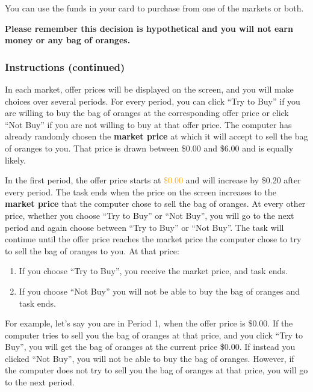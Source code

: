 \documentclass[12pt]{article}
\begin{document}
You can use the funds in your card to purchase from one of the markets or both.

 
\textbf{Please remember this decision is hypothetical and you will not earn money or any bag of oranges.}

\clearpage

\subsubsection*{\textbf{Instructions (continued)}}

 In each market, offer prices will be displayed on the screen, and you will make choices over several periods. For every period, you can click “Try to Buy” if you are willing to buy the bag of oranges at the corresponding offer price or click “Not Buy” if you are not willing to buy at that offer price.
The computer has already randomly chosen the \textbf{market price} at which it will accept to sell the bag of oranges to you. That price is drawn between \$0.00 and \$6.00 and is equally likely.

In the first period, the offer price starts at \textcolor{orange}{\$0.00 }and will increase by \$0.20 after every period. The task ends when the price on the screen increases to the \textbf{market price} that the computer chose to sell the bag of oranges.
At every other price, whether you choose “Try to Buy” or “Not Buy”, you will go to the next period and again choose between “Try to Buy” or “Not Buy”.
The task will continue until the offer price reaches the market price the computer chose to try to sell the bag of oranges to you. At that price:

\begin{enumerate}
    \item If you choose “Try to Buy”, you receive the market price, and task ends.
    \item If you choose “Not Buy” you will not be able to buy the bag of oranges and task ends.
\end{enumerate}


For example, let’s say you are in Period 1, when the offer price is \$0.00. If the computer tries to sell you the bag of oranges at that price, and you click “Try to Buy”, you will get the bag of oranges at the current price \$0.00. If instead you clicked “Not Buy”, you will not be able to buy the bag of oranges. However, if the computer does not try to sell you the bag of oranges at that price, you will go to the next period.

\clearpage
\end{document}
